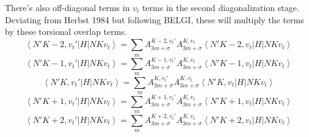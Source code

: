 \documentclass{article}
\begin{document}
There's also off-diagonal terms in $v_{t}$ terms in the second diagonalization stage. Deviating from Herbst 1984 but following BELGI, these will multiply the terms by these torsional overlap terms.
\color{purple}
\begin{equation}\label{rtm2}
\left\langle N' K-2, v_{t}' \right| H \left| NKv_{t}\right\rangle = \sum_{m} A^{K-2,v_{t}'}_{3m+\sigma}A^{K,v_{t}}_{3m+\sigma} \left\langle N' K-2, v_{t} \right| H \left| NKv_{t}\right\rangle
\end{equation}
\color{zgreen}
\begin{equation}\label{rtm1}
\left\langle N' K-1, v_{t}' \right| H \left| NKv_{t}\right\rangle = \sum_{m} A^{K-1,v_{t}'}_{3m+\sigma}A^{K,v_{t}}_{3m+\sigma} \left\langle N' K-1, v_{t} \right| H \left| NKv_{t}\right\rangle
\end{equation}
\color{black}
\begin{equation}\label{rt1}
\left\langle N' K, v_{t}' \right| H \left| NKv_{t}\right\rangle = \sum_{m} A^{K,v_{t}'}_{3m+\sigma}A^{K,v_{t}}_{3m+\sigma} \left\langle N' K, v_{t} \right| H \left| NKv_{t}\right\rangle
\end{equation}
\color{red}
\begin{equation}\label{rt1}
\left\langle N' K+1, v_{t}' \right| H \left| NKv_{t}\right\rangle = \sum_{m} A^{K+1,v_{t}'}_{3m+\sigma}A^{K,v_{t}}_{3m+\sigma} \left\langle N' K+1, v_{t} \right| H \left| NKv_{t}\right\rangle
\end{equation}
\color{blue}
\begin{equation}\label{rt2}
\left\langle N' K+2, v_{t}' \right| H \left| NKv_{t}\right\rangle = \sum_{m} A^{K+2,v_{t}'}_{3m+\sigma}A^{K,v_{t}}_{3m+\sigma} \left\langle N' K+2, v_{t} \right| H \left| NKv_{t}\right\rangle
\end{equation}
\color{black}
\end{document}
